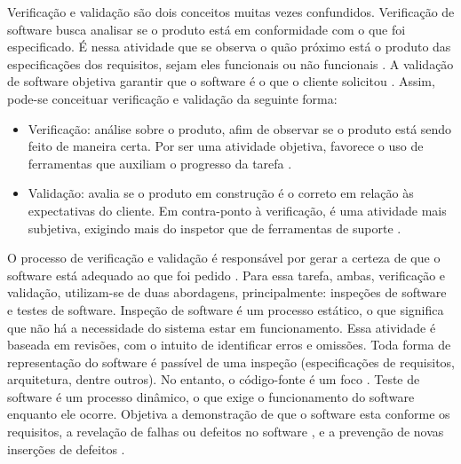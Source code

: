 \par
\indent Verificação e validação são dois conceitos muitas vezes confundidos. Verificação de software busca analisar se o produto está em conformidade com o que foi especificado. É nessa atividade que se observa o quão próximo está o produto das especificações dos requisitos, sejam eles funcionais ou não funcionais \cite{sommerville2007}. A validação de software objetiva garantir que o software é o que o cliente solicitou \cite{sommerville2007}. Assim, pode-se conceituar verificação e validação da seguinte forma:
\begin{itemize}
\item Verificação: análise sobre o produto, afim de observar se o produto está sendo feito de maneira certa. Por ser uma atividade objetiva, favorece o uso de ferramentas que auxiliam o progresso da tarefa \cite{sayao2007}.
\item Validação: avalia se o produto em construção é o correto em relação às expectativas do cliente. Em contra-ponto à verificação, é uma atividade mais subjetiva, exigindo mais do inspetor que de ferramentas de suporte \cite{sayao2007}.
\end{itemize}
\par
\indent O processo de verificação e validação é responsável por gerar a certeza de que o software está adequado ao que foi pedido \cite{sommerville2007}. Para essa tarefa, ambas, verificação e validação, utilizam-se de duas abordagens, principalmente: inspeções de software e testes de software. Inspeção de software é um processo estático, o que significa que não há a necessidade do sistema estar em funcionamento. Essa atividade é baseada em revisões, com o intuito de identificar erros e omissões. Toda forma de representação do software é passível de uma inspeção (especificações de requisitos, arquitetura, dentre outros). No entanto, o código-fonte é um foco \cite{sommerville2007}. Teste de software é um processo dinâmico, o que exige o funcionamento do software enquanto ele ocorre. Objetiva a demonstração de que o software esta conforme os requisitos, a revelação de falhas ou defeitos no software \cite{sommerville2007}, e a prevenção de novas inserções de defeitos \cite{burkeCoyner2003}.

